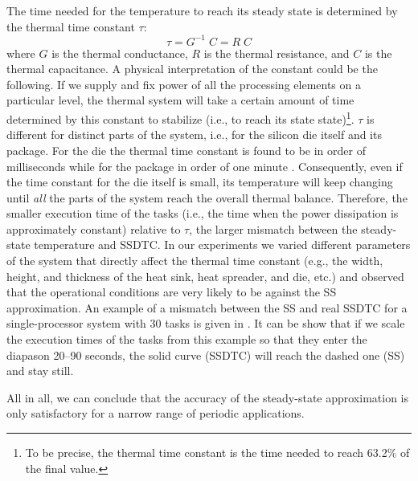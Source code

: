 The time needed for the temperature to reach its steady state is determined by the thermal time constant $\tau$:
\[
  \tau = G^{-1} \; C = R \; C
\]
where $G$ is the thermal conductance, $R$ is the thermal resistance, and $C$ is the thermal capacitance. A physical interpretation of the constant could be the following. If we supply and fix power of all the processing elements on a particular level, the thermal system will take a certain amount of time determined by this constant to stabilize (i.e., to reach its state state)\footnote{To be precise, the thermal time constant is the time needed to reach 63.2\% of the final value.}. $\tau$ is different for distinct parts of the system, i.e., for the silicon die itself and its package. For the die the thermal time constant is found to be in order of milliseconds while for the package in order of one minute \cite{rao2007}. Consequently, even if the time constant for the die itself is small, its temperature will keep changing until \emph{all} the parts of the system reach the overall thermal balance. Therefore, the smaller execution time of the tasks (i.e., the time when the power dissipation is approximately constant) relative to $\tau$, the larger mismatch between the steady-state temperature and SSDTC. In our experiments we varied different parameters of the system that directly affect the thermal time constant (e.g., the width, height, and thickness of the heat sink, heat spreader, and die, etc.) and observed that the operational conditions are very likely to be against the SS approximation. An example of a mismatch between the SS and real SSDTC for a single-processor system with 30 tasks is given in . It can be show that if we scale the execution times of the tasks from this example so that they enter the diapason 20--90 seconds, the solid curve (SSDTC) will reach the dashed one (SS) and stay still.

All in all, we can conclude that the accuracy of the steady-state approximation is only satisfactory for a narrow range of periodic applications.
